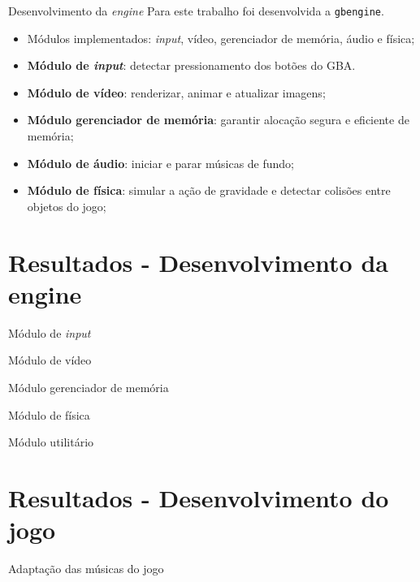 \documentclass[notes, mathserif]{beamer}
\begin{document}
\begin{frame}{Desenvolvimento da \textit{engine}}
	Para este trabalho foi desenvolvida a \texttt{gbengine}.
	\begin{itemize}[<+->]
		\item M\'odulos implementados: \textit{input}, v\'ideo, gerenciador de mem\'oria, \'audio e f\'isica;
		\item \textbf{M\'odulo de \textit{input}}: detectar pressionamento dos bot\~oes do GBA.
		\item \textbf{M\'odulo de v\'ideo}: renderizar, animar e atualizar imagens;
		\item \textbf{M\'odulo gerenciador de mem\'oria}: garantir aloca\c c\~ao segura e eficiente de mem\'oria;
		\item \textbf{M\'odulo de \'audio}: iniciar e parar m\'usicas de fundo;
		\item \textbf{M\'odulo de f\'isica}: simular a a\c c\~ao de gravidade e detectar colis\~oes entre objetos do jogo;
	\end{itemize}
\end{frame}

\section{Resultados - Desenvolvimento da engine}

\begin{frame}{M\'odulo de \textit{input}}
\end{frame}

\begin{frame}{M\'odulo de v\'ideo}
\end{frame}

\begin{frame}{M\'odulo gerenciador de mem\'oria}
\end{frame}

\begin{frame}{M\'odulo de f\'isica}
\end{frame}

\begin{frame}{M\'odulo utilit\'ario}
\end{frame}

\section{Resultados - Desenvolvimento do jogo}

\begin{frame}{Adapta\c c\~ao das m\'usicas do jogo}
\end{frame}
\end{document}
